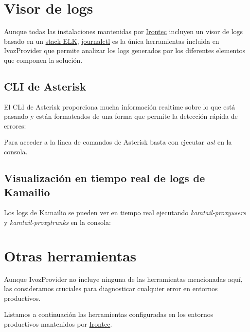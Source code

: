 \documentclass[letterpaper,10pt,spanish]{sphinxmanual}
\begin{document}
\section{Visor de logs}
\label{security_and_maintenance/maintenance/log_viewer::doc}\label{security_and_maintenance/maintenance/log_viewer:log-viewer}
Aunque todas las instalaciones mantenidas por \href{https://www.irontec.com}{Irontec} incluyen un visor de logs basado en un \href{https://www.elastic.co/elk-stack}{stack ELK}, \href{https://www.freedesktop.org/software/systemd/man/journalctl.html}{journalctl} es la única herramientas incluida en IvozProvider que permite analizar los logs generados por los diferentes elementos que componen la solución.


\subsection{CLI de Asterisk}
\label{security_and_maintenance/maintenance/log_viewer:asterisk-cli}
El CLI de Asterisk proporciona mucha información realtime sobre lo que está pasando y están formateados de una forma que permite la detección rápida de errores:

\noindent{}

Para acceder a la línea de comandos de Asterisk basta con ejecutar \emph{ast} en la consola.


\subsection{Visualización en tiempo real de logs de Kamailio}
\label{security_and_maintenance/maintenance/log_viewer:kamailio-realtime-log-viewing}
Los logs de Kamailio se pueden ver en tiempo real ejecutando \emph{kamtail-proxyusers} y \emph{kamtail-proxytrunks} en la consola:

\noindent{}


\section{Otras herramientas}
\label{security_and_maintenance/maintenance/other_tools::doc}\label{security_and_maintenance/maintenance/other_tools:other-tools}
Aunque IvozProvider no incluye ninguna de las herramientas mencionadas aquí, las consideramos cruciales para diagnosticar cualquier error en entornos productivos.

Listamos a continuación las herramientas configuradas en los entornos productivos mantenidos por \href{https://www.irontec.com}{Irontec}.
\end{document}
